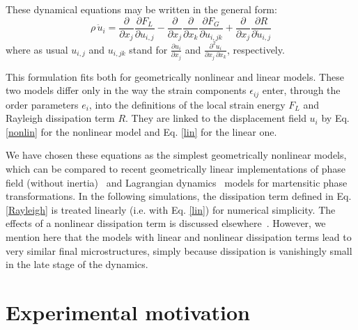 \documentclass[twocolumn,amsmath,amssymb]{revtex4}
\begin{document}
%
%
These dynamical equations may be written in the general form:
\begin{equation}
\rho \,\ddot u_i = \frac{\partial}{\partial x_j} \frac{\partial F_L}{\partial u_{i,j}} - \frac{\partial}{\partial x_j}\frac{\partial}{\partial x_k} \frac{\partial F_G}{\partial u_{i,jk}} +\frac{\partial}{\partial x_j}\frac{\partial R}{\partial \dot u_{i,j}} 
\end{equation}
%
where as usual $u_{i,j}$ and $u_{i,jk}$ stand for $\frac{\partial u_i}{\partial x_j}$ and  $\frac{\partial^2 u_i}{\partial x_j\,\partial x_k}$, respectively.
%

This formulation fits both for geometrically nonlinear and linear models. These two models differ only in the way the strain components $\epsilon_{ij}$ enter, through the order parameters $e_i$, into the definitions of the local strain energy $F_L$ and Rayleigh dissipation term $R$. They are linked to the displacement field $u_i$ by Eq. \ref{nonlin} for the nonlinear model and Eq. \ref{lin} for the linear one.

%
%
We have chosen these equations as the simplest geometrically nonlinear models, which can be compared to recent geometrically linear implementations of phase field (without inertia)~\cite{KerEtAl99, ArtJinKha01,Wang:2004lf} and Lagrangian dynamics~\cite{CunJac01,LooEtAl03,AhlLooSax06} models for martensitic phase transformations.
In the following simulations, the dissipation term defined in Eq. \ref{Rayleigh} is treated linearly (i.e. with Eq. \ref{lin}) for numerical simplicity. The effects of a nonlinear dissipation term is discussed elsewhere~\cite{Sal08,Muite:2009kl}. However, we mention here that the models with linear and nonlinear dissipation terms lead to very similar final microstructures, simply because dissipation is vanishingly small in the late stage of the dynamics.
%
%
%
\section{\label{sec:level2}Experimental motivation}
\end{document}
